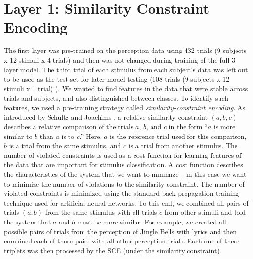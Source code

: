 \section{Layer 1: Similarity Constraint Encoding}
The first layer was pre-trained on the perception data using 432 trials (9 subjects x 12 stimuli x 4 trials) and then was not changed during training of the full 3-layer model. 
The third trial of each stimulus from each subject's data was left out to be used as the test set for later model testing (108 trials (9 subjects x 12 stimuli x 1 trial) ).
We wanted to find features in the data that were stable across trials and subjects, and also distinguished between classes. 
To identify such features, we used a pre-training strategy called \emph{similarity-constraint encoding}.
As introduced by Schultz and Joachims \citeyear{schultz_learning_2004}, a relative similarity constraint $(a,b,c)$ describes a relative comparison of the trials $a$, $b$, and $c$ in the form ``$a$ is more similar to $b$ than $a$ is to $c$.''
Here, $a$ is the reference trial used for this comparison, $b$ is a trial from the same stimulus, and $c$ is a trial from another stimulus.
The number of violated constraints is used as a cost function for learning features of the data that are important for stimulus classification. 
A cost function describes the characteristics of the system that we want to minimize -- in this case we want to minimize the number of violations to the similarity constraint.
The number of violated constraints is minimized using the standard back propagation training technique used for artificial neural networks.
To this end, we combined all pairs of trials $(a,b)$ from the same stimulus with all trials $c$ from other stimuli and told the system that $a$ and $b$ must be more similar.
For example, we created all possible pairs of trials from the perception of Jingle Bells with lyrics and then combined each of those pairs with all other perception trials.
Each one of these triplets was then processed by the \ac{SCE} (under the similarity constraint).
